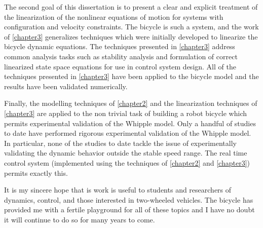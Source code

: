 The second goal of this dissertation is to present a clear and explicit
treatment of the linearization of the nonlinear equations of motion for systems
with configuration and velocity constraints. The bicycle is such a system, and
the work of \autoref{chapter3} generalizes techniques which were initially
developed to linearize the bicycle dynamic equations. The techniques presented
in \autoref{chapter3} address common analysis tasks such as stability analysis
and formulation of correct linearized state space equations for use in control
system design. All of the techniques presented in \autoref{chapter3} have been
applied to the bicycle model and the results have been validated numerically.

Finally, the modelling techniques of \autoref{chapter2} and the linearization
techniques of \autoref{chapter3} are applied to the non trivial task of
building a robot bicycle which permits experimental validation of the Whipple
model. Only a handful of studies to date have performed rigorous experimental
validation of the Whipple model. In particular, none of the studies to date
tackle the issue of experimentally validating the dynamic behavior outside the
stable speed range. The real time control system (implemented using the
techniques of \autoref{chapter2} and \autoref{chapter3}) permits exactly this.

It is my sincere hope that is work is useful to students and researchers of
dynamics, control, and those interested in two-wheeled vehicles. The bicycle
has provided me with a fertile playground for all of these topics and I have no
doubt it will continue to do so for many years to come.
